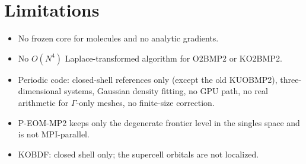 \section{Limitations}

\begin{itemize}
  \item No frozen core for molecules and no analytic gradients.
  \item No $O(N^4)$ Laplace-transformed algorithm for O2BMP2 or KO2BMP2.
  \item Periodic code: closed-shell  references only (except the
        old KUOBMP2), three-dimensional systems, Gaussian density fitting,
        no GPU path, no real arithmetic for $\Gamma$-only meshes, no
        finite-size correction.
  \item P-EOM-MP2 keeps only the degenerate frontier level in the singles
        space and is not MPI-parallel.
  \item KOBDF: closed shell only; the supercell orbitals are not localized.
\end{itemize}
